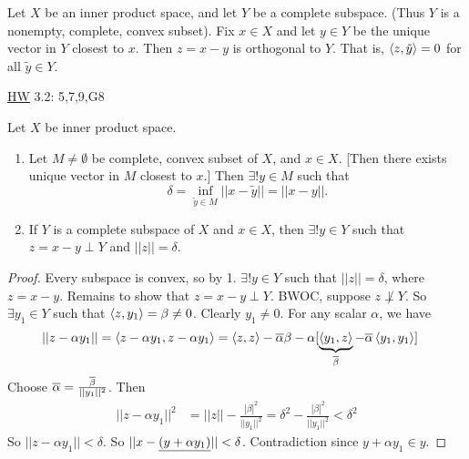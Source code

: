 \documentclass[]{article}
\begin{document}
\begin{lemma}
	Let $X$ be an inner product space, and let $Y$ be a complete subspace.
	(Thus $Y$ is a nonempty, complete, convex subset).
	Fix $x\in X$ and let $y\in Y$ be the unique vector in $Y$ closest to $x$.
	Then $z = x-y$ is orthogonal to $Y$. That is, $\left\langle z,\tilde y \right\rangle=0$ for all $\tilde y\in Y$.
\end{lemma}

\ul{HW} 3.2: 5,7,9,G8

\begin{recall}
Let $X$ be inner product space.
\begin{enumerate}
	\item Let $M\neq\emptyset$ be complete, convex subset of $X$, and $x\in X$.
		[Then there exists unique vector in $M$ closest to $x$.] Then $\exists!y\in M$ such that $$ \delta = \inf_{\tilde y\in M} ||x-\tilde y|| = ||x-y||. $$
	\item If $Y$ is a complete subspace of $X$ and $x\in X$, then $\exists!y\in Y$ such that $z = x-y\perp Y$ and $||z||=\delta$.
\end{enumerate}
\end{recall}
\begin{proof}
	Every subspace is convex, so by 1. $\exists!y\in Y$ such that $||z||=\delta$, where $z=x-y$. Remains to show that $z=x-y\perp Y$.
	BWOC, suppose $z\not\perp Y$. So $\exists y_1\in Y$ such that $\left\langle z,y_1 \right\rangle=\beta\neq0$.
	Clearly $y_1\neq0$. For any scalar $\alpha$, we have 
	\begin{align*}
		||z-\alpha y_1|| &= \left\langle z-\alpha y_1,z-\alpha y_1 \right\rangle 
						 = \left\langle z,z \right\rangle - \overline{\alpha}\beta - \alpha [\underbrace{\left\langle y_1,z \right\rangle}_{\overline{\beta}}-\overline{\alpha}\left\langle y_1,y_1 \right\rangle]
	\end{align*}
	Choose $\overline{\alpha} = \frac{\overline{\beta}}{||y_1||^2}$.
	Then 
	\begin{align*}
		||z-\alpha y_1||^2 &= ||z|| - \frac{|\beta|^2}{||y_1||^2}
						   = \delta^2 - \frac{|\beta|^2}{||y_1||^2} < \delta^2
	\end{align*}
	So $||z-\alpha y_1|| < \delta$. So $||x-\underline{(y+\alpha y_1)}|| < \delta$.
	Contradiction since $y+\alpha y_1\in y$.
\end{proof}
\end{document}
